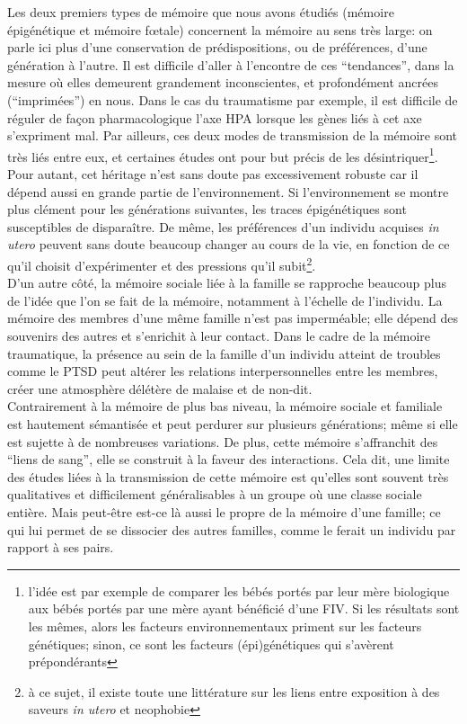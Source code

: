 \documentclass[french]{article}
\begin{document}
			Les deux premiers types de mémoire que nous avons étudiés (mémoire épigénétique et mémoire fœtale) concernent la mémoire au sens très large: on parle ici plus d'une conservation de prédispositions, ou de préférences, d'une génération à l'autre.  Il est difficile d'aller à l'encontre de ces ``tendances'', dans la mesure où elles demeurent grandement inconscientes, et profondément ancrées (``imprimées'') en nous. Dans le cas du traumatisme par exemple, il est difficile de réguler de façon pharmacologique l'axe HPA lorsque les gènes liés à cet axe s'expriment mal. Par ailleurs, ces deux modes de transmission de la mémoire sont très liés entre eux, et certaines études ont pour but précis de les désintriquer\footnote{l'idée est par exemple de comparer les bébés portés par leur mère biologique aux bébés portés par une mère ayant bénéficié d'une FIV. Si les résultats sont les mêmes, alors les facteurs environnementaux priment sur les facteurs génétiques; sinon, ce sont les facteurs (épi)génétiques qui s'avèrent prépondérants}.\\
			Pour autant, cet héritage n'est sans doute pas excessivement robuste car il dépend aussi en grande partie de l'environnement. Si l'environnement se montre plus clément pour les générations suivantes, les traces épigénétiques sont susceptibles de disparaître. De même, les préférences d'un individu acquises \textit{in utero} peuvent sans doute beaucoup changer au cours de la vie, en fonction de ce qu'il choisit d'expérimenter et des pressions qu'il subit\footnote{à ce sujet, il existe toute une littérature sur les liens entre exposition à des saveurs \textit{in utero} et neophobie}.\\
			
			D'un autre côté, la mémoire sociale liée à la famille se rapproche beaucoup plus de l'idée que l'on se fait de la mémoire, notamment à l'échelle de l'individu. La mémoire des membres d'une même famille n'est pas imperméable; elle dépend des souvenirs des autres et s'enrichit à leur contact. Dans le cadre de la mémoire traumatique, la présence au sein de la famille d'un individu atteint de troubles comme le PTSD peut altérer les relations interpersonnelles entre les membres, créer une atmosphère délétère de malaise et de non-dit.\\
			Contrairement à la mémoire de plus bas niveau, la mémoire sociale et familiale est hautement sémantisée et peut perdurer sur plusieurs générations; même si elle est sujette à de nombreuses variations. De plus, cette mémoire s'affranchit des ``liens de sang'', elle se construit à la faveur des interactions. Cela dit, une limite des études liées à la transmission de cette mémoire est qu'elles sont souvent très qualitatives et difficilement généralisables à un groupe où une classe sociale entière. Mais peut-être est-ce là aussi le propre de la mémoire d'une famille; ce qui lui permet de se dissocier des autres familles, comme le ferait un individu par rapport à ses pairs.\\
			
\end{document}
